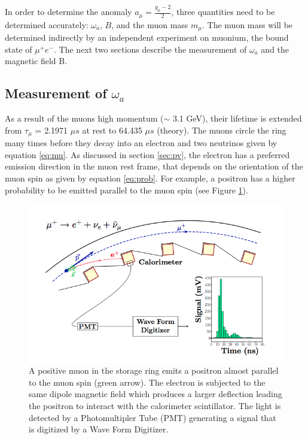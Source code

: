 \documentclass{outhesis}
\begin{document}
In order to determine the anomaly $a_{\mu} = \frac{g_{\mu}-2}{2}$, three quantities need to be determined accurately: $\omega_a$, $B$, and the muon mass $m_{\mu}$. The muon mass will be determined indirectly by an independent experiment on muonium, the bound state of $\mu^+e^-$. The next two sections describe the measurement of $\omega_a$ and the magnetic field B.

\subsection{Measurement of $\omega_a$}

As a result of the muons high momentum ($\sim$ 3.1 GeV), their lifetime is extended from $\tau_{\mu}$ = 2.1971 $\mu s$ at rest to 64.435 $\mu s$ (theory). The muons circle the ring many times before they decay into an electron and two neutrinos given by equation \ref{eq:mu}. As discussed in section \ref{sec:pv}, the electron has a preferred emission direction in the muon rest frame, that depends on the orientation of the muon spin as given by equation \ref{eq:prob}. For example, a positron has a higher probability to be emitted parallel to the muon spin (see Figure \ref{fig:det}). 
\begin{figure}
  \centering
  \includegraphics[scale=0.5]{figures/detection}
  \caption{A positive muon in the storage ring emits a positron almost parallel to the muon spin (green arrow). The electron is subjected to the same dipole magnetic field which produces a larger deflection leading the positron to interact with the calorimeter scintillator. The light is detected by a Photomultipler Tube (PMT) generating a signal that is digitized by a Wave Form Digitizer. \cite{phen}}
  \label{fig:det}
\end{figure}
\end{document}
